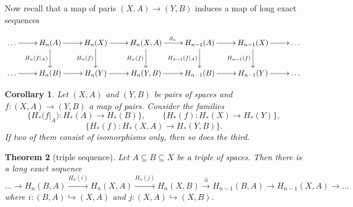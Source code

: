 \documentclass[11pt]{book}
\numberwithin{dummy}{section}
\newtheorem{theorem}{Theorem}[section]
\newtheorem{corollary}[theorem]{Corollary}
\theoremstyle{nonumberbreak}
\newcommand{\la}{\longrightarrow}
\begin{document}
\begin{spacing}{1.4}
Now recall that a map of paris $(X,A) \la (Y,B)$ induces a map of long exact sequences

$$
\begin{xy}
\xymatrix{
 \ldots \ar[r] & H_n(A) \ar[r] \ar[d]_{H_n(f\vert_A)} & H_n(X) \ar[d]_{H_n(f)} \ar[r] & H_n(X,A) \ar[d]_{H_n(f)} \ar[r]^{\partial_n} & H_{n-1}(A) \ar[d]_{H_{n-1}(f\vert_A)} \ar[r] & H_{n-1}(X) \ar[d]_{H_{n-1}(f)} \ar[r] & \ldots \\
 \ldots \ar[r] & H_n(B) \ar[r] & H_n(Y) \ar[r] & H_n(Y,B) \ar[r] & H_{n-1}(B) \ar[r] & H_{n-1}(Y) \ar[r] & \ldots
}
\end{xy}
$$


\begin{corollary}

Let $(X,A)$ and $(Y,B)$ be pairs of spaces and $f: (X,A) \la (Y,B)$ a map of pairs. Consider the families
$$\{H_*({f\vert_A)} : H_*(A) \la H_*(B) \}, \qquad \{H_*(f): H_*(X) \la H_*(Y) \},$$
$$ \{ H_*(f): H_*(X,A) \la H_*(Y,B) \}.$$
If two of them consist of isomorphisms only, then so does the third.
\end{corollary}

\begin{theorem}[triple sequence]
Let $A \subseteq B \subseteq X$ be a triple of spaces. Then there is a long exact sequence
$$\ldots \rightarrow H_n(B,A) \xrightarrow{H_n(i)} H_n(X,A) \xrightarrow{H_n(j)} H_n(X,B) \xrightarrow{\partial} H_{n-1}(B,A) \rightarrow H_{n-1}(X,A) \rightarrow \ldots$$
where $i: (B,A) \hookrightarrow (X,A)$ and $j: (X,A) \hookrightarrow (X,B)$.


\end{theorem}
\end{spacing}
\end{document}
